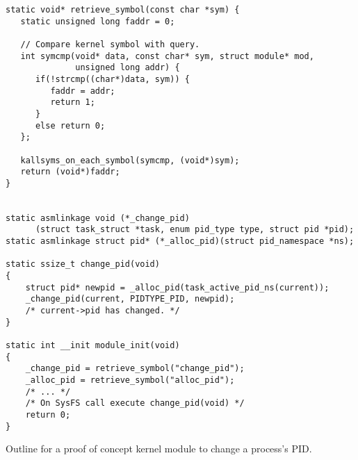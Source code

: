 \documentclass[a4paper,12pt,twoside,openright]{report}
\begin{document}
\begin{listing}[h]
\begin{verbatim}
static void* retrieve_symbol(const char *sym) { 
   static unsigned long faddr = 0;  

   // Compare kernel symbol with query.
   int symcmp(void* data, const char* sym, struct module* mod, 
              unsigned long addr) { 
      if(!strcmp((char*)data, sym)) { 
         faddr = addr; 
         return 1; 
      } 
      else return 0; 
   }; 

   kallsyms_on_each_symbol(symcmp, (void*)sym); 
   return (void*)faddr; 
} 


static asmlinkage void (*_change_pid)
      (struct task_struct *task, enum pid_type type, struct pid *pid);
static asmlinkage struct pid* (*_alloc_pid)(struct pid_namespace *ns);

static ssize_t change_pid(void)
{
    struct pid* newpid = _alloc_pid(task_active_pid_ns(current));
    _change_pid(current, PIDTYPE_PID, newpid);
    /* current->pid has changed. */
}

static int __init module_init(void)
{
    _change_pid = retrieve_symbol("change_pid");
    _alloc_pid = retrieve_symbol("alloc_pid");
    /* ... */
    /* On SysFS call execute change_pid(void) */
    return 0;
}

\end{verbatim}
\caption{Outline for a proof of concept kernel module to change a process's PID.}
\end{listing}



\clearpage
\printnoidxglossary[type=\acronymtype]
\printnoidxglossary[style=mystyle, title=Special Terms, toctitle=List of terms]

 
 

\end{document}
